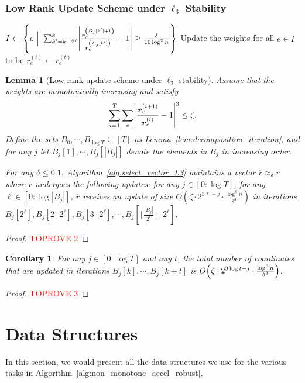 \documentclass[11pt]{article}
\newtheorem{lemma}[theorem]{Lemma}
\newtheorem{corollary}[theorem]{Corollary}
\let\originalleft\left
\let\originalright\right
\renewcommand{\left}{\mathopen{}\mathclose\bgroup\originalleft}
\renewcommand{\right}{\aftergroup\egroup\originalright}
\newcommand\rr{\boldsymbol{\mathit{r}}}
\newcommand\rrbar{\overline{\boldsymbol{\mathit{r}}}}
\begin{document}
\subsubsection{Low Rank Update Scheme under \texorpdfstring{$\ell_3$}{} Stability}
\begin{algorithm}[H]
\caption{Low rank update in the $t$-th iteration}
\label{alg:select_vector_L3}
 \begin{algorithmic}[1]
\Procedure{SelectVectorL3}{$\rr^{(t)}$}
\State $I \leftarrow \left\{ e ~\Big|~
\sum_{k' = k - 2^{\ell}}^{k} \left|\frac{\rr_e^{\left(B_j[k'] + 1\right)}}{\rr_e^{\left(B_j[k'] \right)}} - 1 \right| \geq \frac{\delta}{10 \log^2 n}\right\}$
\EndIf
\State Update the weights for all $e \in I$ to be $\rrbar^{(t)}_e \leftarrow \rr^{(t)}_e$
\EndFor
\EndFor
\EndProcedure 
\end{algorithmic}
\end{algorithm}

\begin{lemma}[Low-rank update scheme under $\ell_3$ stability]\label{lem:LowRankL3}
Assume that the weights are monotonically increasing and satisfy 
\[
\sum_{i=1}^T \sum_{e} \left|\frac{\rr_e^{\left(i + 1\right)}}{\rr_e^{\left(i \right)}} - 1 \right|^3 \leq \zeta. 
\]
Define the sets $B_0, \cdots, B_{\log T} \subseteq [T]$ as Lemma~\ref{lem:decomposition_iteration}, and for any $j$ let $B_j[1], \cdots, B_j[|B_j|]$ denote the elements in $B_j$ in increasing order. 

For any $\delta \leq 0.1$, Algorithm~\ref{alg:select_vector_L3} maintains a vector $\rrbar \approx_{\delta} \rr$ where $\rrbar$ undergoes the following updates: for any $j \in [0: \log T]$, for any $\ell \in [0: \log |B_j|]$, $\rrbar$ receives an update of size $O(\zeta \cdot 2^{3 \ell-j} \cdot \frac{\log^6 n}{\delta^3})$ in iterations $B_j[2^{\ell}], B_j[2 \cdot 2^{\ell}], B_j[3 \cdot 2^{\ell}], \cdots, B_j[\lfloor \frac{|B_j|}{2^{\ell}} \rfloor \cdot 2^{\ell}]$.
\end{lemma}
\begin{proof}\textcolor{red}{TOPROVE 2}\end{proof}

\begin{corollary}\label{cor:LowRankL3}
For any $j \in [0:\log T]$ and any $t$, the total number of coordinates that are updated in iterations $B_j[k], \cdots, B_j[k+t]$ is $O\left(\zeta \cdot 2^{3 \log t-j} \cdot \frac{\log^6 n}{\delta^3} \right)$.
\end{corollary}
\begin{proof}\textcolor{red}{TOPROVE 3}\end{proof} \section{Data Structures}\label{sec:data_structures}
In this section, we would present all the data structures we use for the various tasks in Algorithm~\ref{alg:non_monotone_accel_robust}. 
\end{document}

